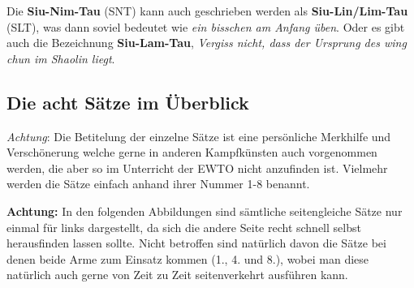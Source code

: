 

\WTlistofvideos %





\begin{WTCommonBegriff}
	Die \textbf{Siu-Nim-Tau} (SNT) kann auch geschrieben werden als \textbf{Siu-Lin/Lim-Tau} (SLT), was dann soviel bedeutet wie \textit{ein bisschen am Anfang \"uben}. Oder es gibt auch die Bezeichnung \textbf{Siu-Lam-Tau}, \textit{Vergiss nicht, dass der Ursprung des wing chun im Shaolin liegt}.
\end{WTCommonBegriff}

\subsection*{Die acht S\"atze im \"Uberblick}

\textit{Achtung}: Die Betitelung der einzelne S\"atze ist eine pers\"onliche Merkhilfe und Versch\"onerung welche gerne in anderen Kampfk\"unsten auch vorgenommen werden, die aber so im Unterricht der EWTO nicht anzufinden ist. Vielmehr werden die S\"atze einfach anhand ihrer Nummer 1-8 benannt.


\textbf{Achtung: } In den folgenden Abbildungen sind s\"amtliche seitengleiche S\"atze nur einmal f\"ur links dargestellt, da sich die andere Seite recht schnell selbst herausfinden lassen sollte. Nicht betroffen sind nat\"urlich davon die S\"atze bei denen beide Arme zum Einsatz kommen (1., 4. und 8.), wobei man diese nat\"urlich auch gerne von Zeit zu Zeit seitenverkehrt ausf\"uhren kann.


